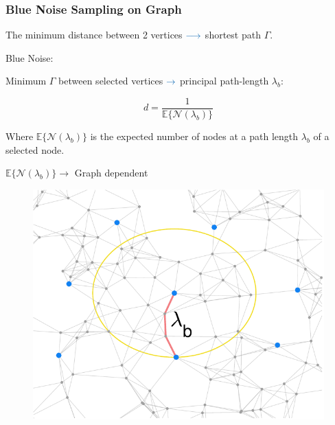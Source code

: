 \documentclass[11pts]{beamer}
\begin{document}
\begin{frame}%
\frametitle{Blue Noise Sampling on Graph}
The minimum distance between 2 vertices $\textcolor{bar}{\mathbf{    \longrightarrow}}$ shortest path $\Gamma$.

Blue Noise: 

Minimum $\Gamma$ between  selected vertices $\textcolor{bar}{\mathbf{\rightarrow}}$ principal path-length $\lambda_{b}$:


\begin{minipage}{0.5\textwidth}

\begin{equation*}
    d=\frac{1}{\mathbb{E}\{\mathcal{N}(\lambda_{b})\}}
\end{equation*}

Where $\mathbb{E}\{\mathcal{N}(\lambda_{b})\}$ is the expected number of nodes at a path length $\lambda_{b}$ of a selected node.

\begin{center}
    $\mathbb{E}\{\mathcal{N}(\lambda_{b})\}\rightarrow$ Graph dependent
\end{center}

    \end{minipage}
    \hfill
    \begin{minipage}{0.45\textwidth}
    \vspace*{0.5cm}
    \centering

  \begin{figure}
     \centering
     \includegraphics[scale=0.37]{IM/PATH.pdf}
 \end{figure}
    \end{minipage}


\end{frame}
\end{document}
